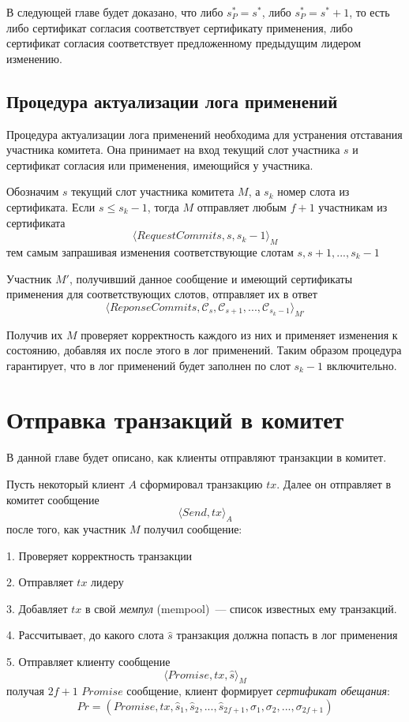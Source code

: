 В следующей главе будет доказано, что либо $s_P^{*}=s^{*}$, либо $s_P^{*}=s^{*}+1$, то есть либо сертификат согласия соответствует сертификату применения, либо сертификат согласия соответствует предложенному предыдущим лидером изменению.

\subsection{Процедура актуализации лога применений} \label{act_log}
Процедура актуализации лога применений необходима для устранения отставания участника комитета.
Она принимает на вход текущий слот участника $s$ и сертификат согласия или применения, имеющийся у участника.

Обозначим $s$ текущий слот участника комитета $M$, а $s_k$ номер слота из сертификата. Если $s \le s_k-1$, тогда $M$ отправляет любым $f+1$ участникам из сертификата 
\[ \langle RequestCommits, s, s_k-1 \rangle_M \]
тем самым запрашивая изменения соответствующие слотам $s, s+1,..., s_k-1$

Участник $M'$, получивший данное сообщение и имеющий сертификаты применения для соответствующих слотов, отправляет их в ответ
\[ \langle ReponseCommits, \mathcal{C}_s, \mathcal{C}_{s+1},...,\mathcal{C}_{s_k-1} \rangle_{M'} \]

Получив их $M$ проверяет корректность каждого из них и применяет изменения к состоянию, добавляя их после этого в лог применений. Таким образом процедура гарантирует, что в лог применений будет заполнен по слот $s_k-1$ включительно.

\section{Отправка транзакций в комитет}
В данной главе будет описано, как клиенты отправляют транзакции в комитет.

Пусть некоторый клиент $A$ сформировал транзакцию $tx$. Далее он отправляет в комитет сообщение
\[ \langle Send, tx \rangle_A \]
после того, как участник $M$ получил сообщение:

1. Проверяет корректность транзакции

2. Отправляет $tx$ лидеру

3. Добавляет $tx$ в свой \textit{мемпул} (mempool)~--- список известных ему транзакций. 

4. Рассчитывает, до какого слота $\hat{s}$ транзакция должна попасть в лог применения

5. Отправляет клиенту сообщение
\[ \langle Promise, tx, \hat{s} \rangle_M \]
получая $2f+1$ $Promise$ сообщение, клиент формирует \textit{сертификат обещания}:
$$Pr=(Promise, tx,  \hat{s}_1,  \hat{s}_2,..., \hat{s}_{2f+1}, \sigma_1, \sigma_2,...,\sigma_{2f+1})$$

